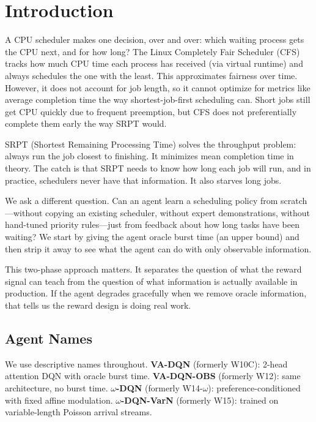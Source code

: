 \documentclass[10pt,twocolumn]{article}
\theoremstyle{remark}
\newcommand{\vadqn}{VA-DQN}
\newcommand{\vaobs}{VA-DQN-OBS}
\newcommand{\omegadqn}{$\omega$-DQN}
\newcommand{\omegavarn}{$\omega$-DQN-VarN}
\begin{document}
\section{Introduction}

A CPU scheduler makes one decision, over and over: which waiting
process gets the CPU next, and for how long? The Linux Completely
Fair Scheduler (CFS) tracks how much CPU time each process has
received (via virtual runtime) and always schedules the one with
the least. This approximates fairness over time. However, it does
not account for job length, so it cannot optimize for metrics like
average completion time the way shortest-job-first scheduling can.
Short jobs still get CPU quickly due to frequent preemption, but
CFS does not preferentially complete them early the way SRPT would.

SRPT (Shortest Remaining Processing Time) solves the throughput
problem: always run the job closest to finishing. It minimizes mean
completion time in theory. The catch is that SRPT needs to know how
long each job will run, and in practice, schedulers never have that
information. It also starves long jobs.

We ask a different question. Can an agent learn a scheduling policy
from scratch---without copying an existing scheduler, without expert
demonstrations, without hand-tuned priority rules---just from
feedback about how long tasks have been waiting? We start by giving
the agent oracle burst time (an upper bound) and then strip it away
to see what the agent can do with only observable information.

This two-phase approach matters. It separates the question of what
the reward signal can teach from the question of what information is
actually available in production. If the agent degrades gracefully
when we remove oracle information, that tells us the reward design
is doing real work.

\subsection*{Agent Names}

We use descriptive names throughout.
\textbf{\vadqn} (formerly W10C): 2-head attention DQN with oracle
burst time.
\textbf{\vaobs} (formerly W12): same architecture, no burst time.
\textbf{\omegadqn} (formerly W14-$\omega$): preference-conditioned
with fixed affine modulation.
\textbf{\omegavarn} (formerly W15): trained on variable-length
Poisson arrival streams.
\end{document}
